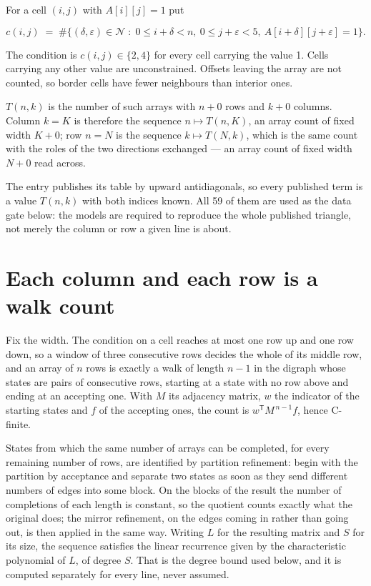 \documentclass[11pt]{article}
\theoremstyle{definition}
\begin{document}
For a cell $(i,j)$ with $A[i][j] = 1$ put

\[c(i,j) \;=\; \#\bigl\{(\delta,\varepsilon)\in\mathcal{N} \;:\; 0\le i+\delta<n,\ 0\le j+\varepsilon<5,\ A[i+\delta][j+\varepsilon] = 1\bigr\}.\]

The condition is $c(i,j) \in \{2, 4\}$ for every cell carrying the value 1. Cells carrying any other value are unconstrained. Offsets leaving the array are not counted, so border cells have fewer neighbours than interior ones.

$T(n,k)$ is the number of such arrays with $n + 0$ rows and $k + 0$ columns. Column $k = K$ is therefore the sequence $n \mapsto T(n,K)$, an array count of fixed width $K + 0$; row $n = N$ is the sequence $k \mapsto T(N,k)$, which is the same count with the roles of the two directions exchanged --- an array count of fixed width $N + 0$ read across.

The entry publishes its table by upward antidiagonals, so every published term is a value $T(n,k)$ with both indices known. All 59 of them are used as the data gate below: the models are required to reproduce the whole published triangle, not merely the column or row a given line is about.

\section{Each column and each row is a walk count}

Fix the width. The condition on a cell reaches at most one row up and one row down, so a window of three consecutive rows decides the whole of its middle row, and an array of $n$ rows is exactly a walk of length $n-1$ in the digraph whose states are pairs of consecutive rows, starting at a state with no row above and ending at an accepting one. With $M$ its adjacency matrix, $w$ the indicator of the starting states and $f$ of the accepting ones, the count is $w^{\mathsf T}M^{\,n-1}f$, hence C-finite.

States from which the same number of arrays can be completed, for every remaining number of rows, are identified by partition refinement: begin with the partition by acceptance and separate two states as soon as they send different numbers of edges into some block. On the blocks of the result the number of completions of each length is constant, so the quotient counts exactly what the original does; the mirror refinement, on the edges coming in rather than going out, is then applied in the same way. Writing $L$ for the resulting matrix and $S$ for its size, the sequence satisfies the linear recurrence given by the characteristic polynomial of $L$, of degree $S$. That is the degree bound used below, and it is computed separately for every line, never assumed.
\end{document}
